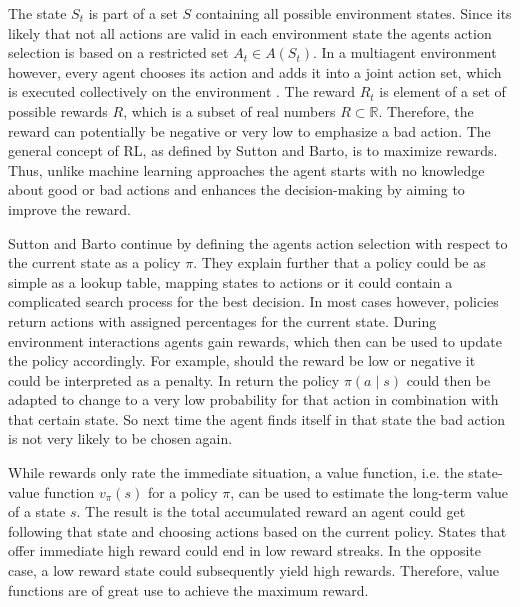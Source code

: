 The state $S_t$ is part of a set $S$ containing all possible environment states. Since its likely that not all actions are valid in each environment state the agents action selection is based on a restricted set $A_t\in A(S_t)$. In a multiagent environment however, every agent chooses its action and adds it into a joint action set, which is executed collectively on the environment \cite{buba10}. The reward $R_t$ is element of a set of possible rewards $R$, which is a subset of real numbers $R \subset \mathbb{R}$. Therefore, the reward can potentially be negative or very low to emphasize a bad action. The general concept of RL, as defined by Sutton and Barto, is to maximize rewards. Thus, unlike machine learning approaches the agent starts with no knowledge about good or bad actions and enhances the decision-making by aiming to improve the reward.

Sutton and Barto continue by defining the agents action selection with respect to the current state as a policy $\pi$. They explain further that a policy could be as simple as a lookup table, mapping states to actions or it could contain a complicated search process for the best decision.
In most cases however, policies return actions with assigned percentages for the current state.
During environment interactions agents gain rewards, which then can be used to update the policy accordingly. For example, should the reward be low or negative it could be interpreted as a penalty. In return the policy $\pi(a \mid s)$ could then be adapted to change to a very low probability for that action in combination with that certain state. So next time the agent finds itself in that state the bad action is not very likely to be chosen again.

While rewards only rate the immediate situation, a value function, i.e. the state-value function $v_{\pi}(s)$ for a policy $\pi$, can be used to estimate the long-term value of a state $s$. The result is the total accumulated reward an agent could get following that state and choosing actions based on the current policy. States that offer immediate high reward could end in
low reward streaks. In the opposite case, a low reward state could subsequently yield high rewards. Therefore, value functions are of great use to achieve the maximum reward.

